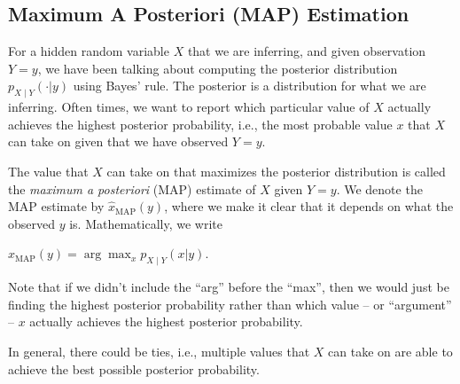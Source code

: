 \documentclass[6008notes.tex]{subfiles}
\begin{document}
\subsection{Maximum A Posteriori (MAP) Estimation}

For a hidden random variable $X$ that we are inferring, and given observation $Y=y$, we have been talking about computing the posterior distribution $p_{X \mid Y}(\cdot | y)$ using Bayes' rule. The posterior is a distribution for what we are inferring. Often times, we want to report which particular value of $X$ actually achieves the highest posterior probability, i.e., the most probable value $x$ that $X$ can take on given that we have observed $Y=y$.

The value that $X$ can take on that maximizes the posterior distribution is called the \textit{maximum a posteriori} (MAP) estimate of $X$ given $Y=y$. We denote the MAP estimate by $\widehat{x}_{\text {MAP}}(y)$, where we make it clear that it depends on what the observed $y$ is. Mathematically, we write

{\centering$\widehat{x}_{\text {MAP}}(y) = \arg \max _ x p_{X \mid Y}(x | y).$ \par}
 
Note that if we didn't include the ``arg'' before the ``max'', then we would just be finding the highest posterior probability rather than which value -- or ``argument'' -- $x$ actually achieves the highest posterior probability.

In general, there could be ties, i.e., multiple values that $X$ can take on are able to achieve the best possible posterior probability.
\end{document}
